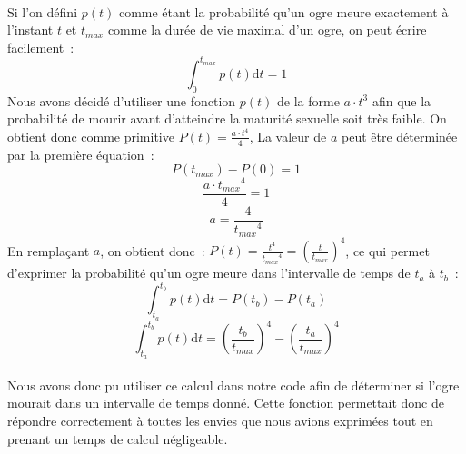 \paragraph{}
Si l'on défini $p(t)$ comme étant la probabilité qu'un ogre meure exactement
à l'instant $t$ et $t_{max}$ comme la durée de vie maximal d'un ogre, on
peut écrire facilement~:
$$\int_0^{t_{max}} p(t) \mathrm dt = 1$$
Nous avons décidé d'utiliser une fonction $p(t)$ de la forme $a \cdot t^3$
afin que la probabilité de mourir avant d'atteindre la maturité sexuelle soit
très faible. On obtient donc comme primitive $P(t) = \frac{a \cdot t^4}{4}$,
La valeur de $a$ peut être déterminée par la première équation~:
$$P(t_{max}) - P(0) = 1$$
$$\frac{a \cdot {t_{max}}^4}{4} = 1$$
$$ a = \frac{4}{{t_{max}}^4}$$
En remplaçant $a$, on obtient donc~:
$P(t) = \frac{t^4}{{t_{max}}^4} = \left ( \frac{t}{t_{max}} \right ) ^4$, ce qui
permet d'exprimer la probabilité qu'un ogre meure dans l'intervalle de temps
de $t_a$ à $t_b$~:
$$\int_{t_a}^{t_b} p(t) \mathrm dt = P(t_b) - P(t_a)$$
$$\int_{t_a}^{t_b} p(t) \mathrm dt = \left ( \frac{t_b}{t_{max}} \right ) ^4 - \left ( \frac{t_a}{t_{max}} \right ) ^4$$

\paragraph{}
Nous avons donc pu utiliser ce calcul dans notre code afin de déterminer si
l'ogre mourait dans un intervalle de temps donné. Cette fonction permettait
donc de répondre correctement à toutes les envies que nous avions exprimées
tout en prenant un temps de calcul négligeable.
